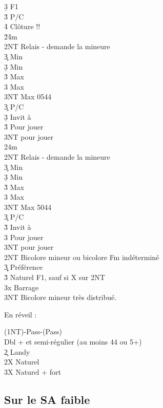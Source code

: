 \documentclass[a4paper]{article}
\begin{document}
\begin{bidtable}
3\d \> F1\\
3\h\s \> P/C\\
4\h\s \> Clôture !!\-\\
2\h {}\h 4m\+\\
2NT \> Relais - demande la mineure\+\\
3\c \> Min \c \\
3\d \> Min \d \\
3\h \> Max \c \\
3\s \> Max \d \\
3NT \> Max 0544\-\\
3\c \> P/C\\
3\d \> Invit à \h \\
3\h \> Pour jouer\\
3NT \> pour jouer\-\\
2\s {}\s 4m\+\\
2NT \> Relais - demande la mineure\+\\
3\c \> Min \c \\
3\d \> Min \d \\
3\h \> Max \c \\
3\s \> Max \d \\
3NT \> Max 5044\-\\
3\c \> P/C\\
3\h \> Invit à \s \\
3\s \> Pour jouer\\
3NT \> pour jouer\-\\
2NT \> Bicolore mineur ou bicolore Fm indéterminé\+\\
3\c\d \> Préférence\\
3\h\s \> Naturel F1, sauf si X sur 2NT\-\\
3x \> Barrage\\
3NT \> Bicolore mineur très distribué.\-
\end{bidtable}

En réveil :

\begin{bidtable}
(1NT)-Pass-(Pass)\+\\
Dbl + et semi-régulier (au moins 44 ou 5+)\\
2\c \> Landy\\
2X \> Naturel\\
3X \> Naturel + fort\-
\end{bidtable}

\subsection{Sur le SA faible}
\end{document}
